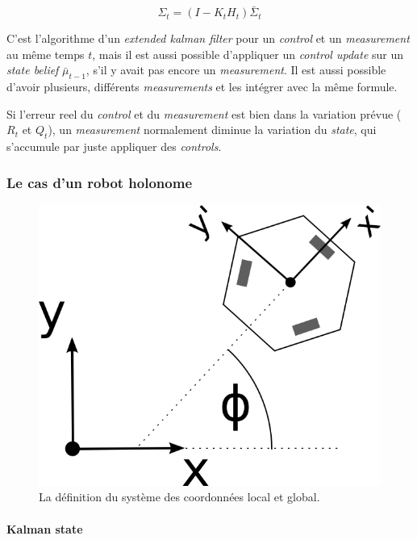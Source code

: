 \documentclass[a4paper]{paper}
\begin{document}
\begin{equation}
    \Sigma_t = \left( I - K_t H_t \right) \bar{\Sigma}_t
\end{equation}

C'est l'algorithme d'un \emph{extended kalman filter} pour un \emph{control} et un
\emph{measurement} au même temps $ t $, mais il est aussi possible d'appliquer un
\emph{control update} sur un \emph{state belief} $ \bar{\mu}_{t-1} $, s'il y avait
pas encore un \emph{measurement}. Il est aussi possible d'avoir plusieurs,
différents \emph{measurements} et les intégrer avec la même formule.

Si l'erreur reel du \emph{control} et du \emph{measurement} est bien dans la
variation prévue ($ R_t $ et $ Q_t $), un \emph{measurement} normalement
diminue la variation du \emph{state}, qui s'accumule par juste appliquer
des \emph{controls}.

\subsubsection{Le cas d'un robot holonome}

\begin{figure}[h]
    \centering
    \includegraphics{coordinate_system.png}
    \caption{La définition du système des coordonnées local et global.}
    \label{fig:coordinate_system}
\end{figure}

\paragraph{Kalman state}
\end{document}
